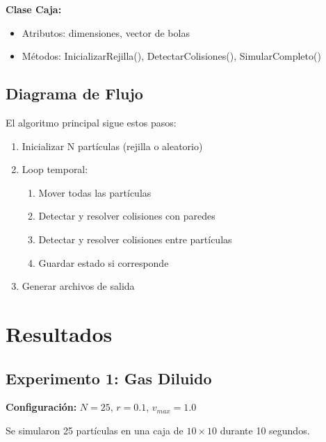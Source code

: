 \documentclass[12pt,a4paper]{article}
\begin{document}
\textbf{Clase Caja:}
\begin{itemize}
    \item Atributos: dimensiones, vector de bolas
    \item Métodos: InicializarRejilla(), DetectarColisiones(), SimularCompleto()
\end{itemize}

\subsection{Diagrama de Flujo}

El algoritmo principal sigue estos pasos:
\begin{enumerate}
    \item Inicializar N partículas (rejilla o aleatorio)
    \item Loop temporal:
    \begin{enumerate}
        \item Mover todas las partículas
        \item Detectar y resolver colisiones con paredes
        \item Detectar y resolver colisiones entre partículas
        \item Guardar estado si corresponde
    \end{enumerate}
    \item Generar archivos de salida
\end{enumerate}

\section{Resultados}

\subsection{Experimento 1: Gas Diluido}

\textbf{Configuración:} $N=25$, $r=0.1$, $v_{max}=1.0$

Se simularon 25 partículas en una caja de $10\times10$ durante 10 segundos.
\end{document}
